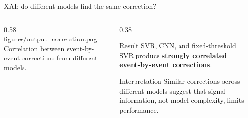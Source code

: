 \begin{frame}{XAI: do different models find the same correction?}
\small

\begin{columns}[T,totalwidth=\textwidth]

\begin{column}{0.58\textwidth}
\centering
\smartimage[0.98\linewidth]{0.68\textheight}
{figures/output_correlation.png}
{Correlation between event-by-event corrections from different models.}
\end{column}

\begin{column}{0.38\textwidth}

\begin{block}{Result}
SVR, CNN, and fixed-threshold SVR produce
\textbf{strongly correlated event-by-event corrections}.
\end{block}

\vspace{0.4em}

\begin{alertblock}{Interpretation}
Similar corrections across different models suggest that
signal information, not model complexity, limits performance.
\end{alertblock}

\end{column}
\end{columns}

\end{frame}

